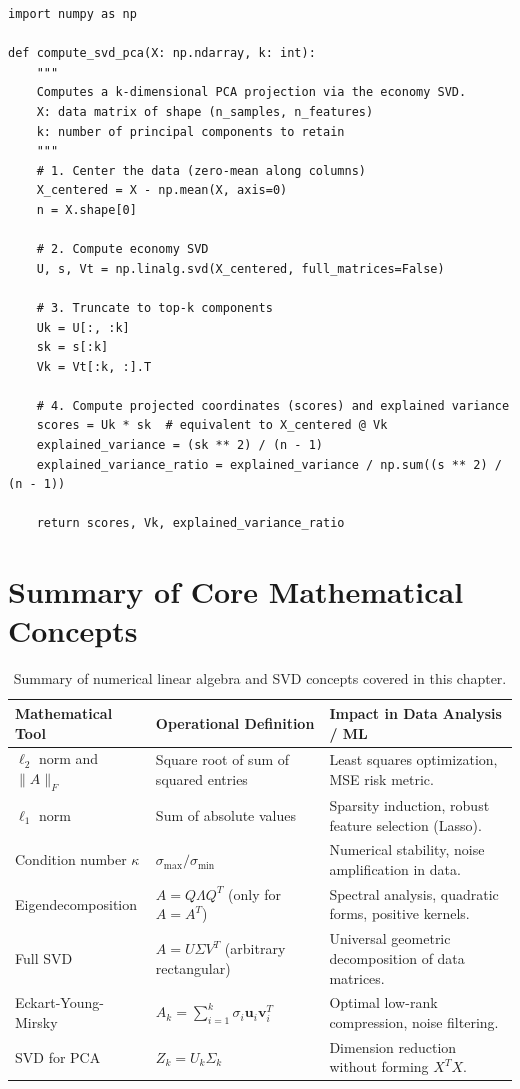 \begin{lstlisting}[style=pythoncode,caption={Compact Truncated SVD and PCA computation using NumPy.}]
import numpy as np

def compute_svd_pca(X: np.ndarray, k: int):
    """
    Computes a k-dimensional PCA projection via the economy SVD.
    X: data matrix of shape (n_samples, n_features)
    k: number of principal components to retain
    """
    # 1. Center the data (zero-mean along columns)
    X_centered = X - np.mean(X, axis=0)
    n = X.shape[0]

    # 2. Compute economy SVD
    U, s, Vt = np.linalg.svd(X_centered, full_matrices=False)

    # 3. Truncate to top-k components
    Uk = U[:, :k]
    sk = s[:k]
    Vk = Vt[:k, :].T

    # 4. Compute projected coordinates (scores) and explained variance
    scores = Uk * sk  # equivalent to X_centered @ Vk
    explained_variance = (sk ** 2) / (n - 1)
    explained_variance_ratio = explained_variance / np.sum((s ** 2) / (n - 1))

    return scores, Vk, explained_variance_ratio
\end{lstlisting}

\FloatBarrier
\section{Summary of Core Mathematical Concepts}

\begin{table}[H]
  \centering
  \small
  \setlength{\tabcolsep}{6pt}
  \begin{tabularx}{\textwidth}{l Y Y}
    \toprule
    \textbf{Mathematical Tool} & \textbf{Operational Definition} & \textbf{Impact in Data Analysis / ML} \\
    \midrule
    $\ell_2$ norm and $\|A\|_F$ & Square root of sum of squared entries & Least squares optimization, MSE risk metric. \\
    $\ell_1$ norm & Sum of absolute values & Sparsity induction, robust feature selection (Lasso). \\
    Condition number $\kappa$ & $\sigma_{\max} / \sigma_{\min}$ & Numerical stability, noise amplification in data. \\
    Eigendecomposition & $A = Q \Lambda Q^T$ (only for $A = A^T$) & Spectral analysis, quadratic forms, positive kernels. \\
    Full SVD & $A = U \Sigma V^T$ (arbitrary rectangular) & Universal geometric decomposition of data matrices. \\
    Eckart-Young-Mirsky & $A_k = \sum_{i=1}^k \sigma_i \mathbf{u}_i \mathbf{v}_i^T$ & Optimal low-rank compression, noise filtering. \\
    SVD for PCA & $Z_k = U_k \Sigma_k$ & Dimension reduction without forming $X^T X$. \\
    \bottomrule
  \end{tabularx}
  \caption{Summary of numerical linear algebra and SVD concepts covered in this chapter.}
  \label{tab:summary-linear-algebra-svd-en}
\end{table}
